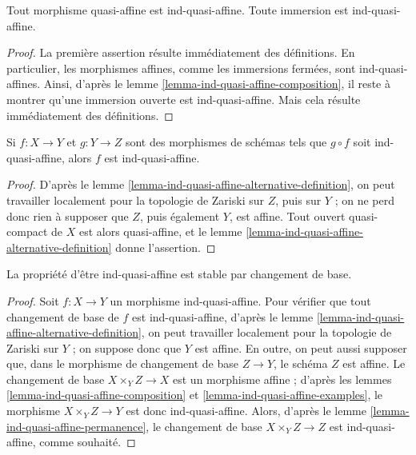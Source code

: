 \begin{lemma}
\label{lemma-ind-quasi-affine-examples}
Tout morphisme quasi-affine est ind-quasi-affine.
Toute immersion est ind-quasi-affine.
\end{lemma}

\begin{proof}
La première assertion résulte immédiatement des définitions.
En particulier, les morphismes affines, comme les immersions fermées,
sont ind-quasi-affines. Ainsi, d'après le
lemme \ref{lemma-ind-quasi-affine-composition}, il reste
à montrer qu'une immersion ouverte est ind-quasi-affine.
Mais cela résulte immédiatement des définitions.
\end{proof}

\begin{lemma}
\label{lemma-ind-quasi-affine-permanence}
Si $f : X \to Y$ et $g : Y \to Z$ sont des morphismes de schémas
tels que $g \circ f$ soit ind-quasi-affine, alors $f$ est ind-quasi-affine.
\end{lemma}

\begin{proof}
D'après le lemme \ref{lemma-ind-quasi-affine-alternative-definition}, on peut
travailler localement pour la topologie de Zariski sur $Z$, puis sur $Y$ ; on ne perd donc
rien à supposer que $Z$, puis également $Y$, est affine. Tout ouvert quasi-compact
de $X$ est alors quasi-affine, et le
lemme \ref{lemma-ind-quasi-affine-alternative-definition} donne l'assertion.
\end{proof}

\begin{lemma}
\label{lemma-base-change-ind-quasi-affine}
La propriété d'être ind-quasi-affine est stable par changement de base.
\end{lemma}

\begin{proof}
Soit $f : X \to Y$ un morphisme ind-quasi-affine.
Pour vérifier que tout changement de base de $f$ est ind-quasi-affine, d'après le
lemme \ref{lemma-ind-quasi-affine-alternative-definition}, on peut travailler
localement pour la topologie de Zariski sur $Y$ ; on suppose donc que $Y$ est affine.
En outre, on peut aussi supposer que, dans le morphisme de changement de base
$Z \to Y$, le schéma $Z$ est affine. Le changement de base
$X \times_Y Z \to X$ est un morphisme affine ; d'après les
lemmes \ref{lemma-ind-quasi-affine-composition} et
\ref{lemma-ind-quasi-affine-examples},
le morphisme $X \times_Y Z \to Y$ est donc ind-quasi-affine. Alors, d'après le
lemme \ref{lemma-ind-quasi-affine-permanence}, le changement
de base $X \times_Y Z \to Z$ est ind-quasi-affine, comme souhaité.
\end{proof}

